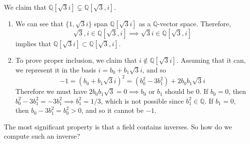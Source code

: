   \begin{example}
    \label{ex:extensions-of-sqrt3i-and-sqrt3i}
    We claim that $\mathbb{Q}[\sqrt{3} i] \subsetneq \mathbb{Q}[\sqrt{3}, i]$. 
    \begin{enumerate}
      \item We can see that $\{1, \sqrt{3}i \}$ span $\mathbb{Q}[\sqrt{3}i ]$ as a $\mathbb{Q}$-vector space. Therefore, 
      \begin{equation}
        \sqrt{3}, i \in \mathbb{Q}[\sqrt{3}, i] \implies \sqrt{3} i \in \mathbb{Q}[\sqrt{3}, i]
      \end{equation} 
      implies that $\mathbb{Q}[\sqrt{3} i] \subset \mathbb{Q}[\sqrt{3}, i]$. 

      \item To prove proper inclusion, we claim that $i \not\in \mathbb{Q}[\sqrt{3}i]$. Assuming that it can, we represent it in the basis $i = b_0 + b_1 \sqrt{3} i$, and so
      \begin{equation}
        -1 = (b_0 + b_1 \sqrt{3} i)^2 = (b_0^2 - 3b_1^2) + 2b_0 b_1 \sqrt{3} i
      \end{equation}
      Therefore we must have $2b_0 b_1 \sqrt{3} = 0 \implies b_0$ or $b_1$ should be $0$. If $b_0 = 0$, then $b_0^2 - 3b_1^2 = -3 b_1^2 \implies b_1^2 = 1/3$, which is not possible since $b_1^2 \in \mathbb{Q}$. If $b_1 = 0$, then $b_0 - 3 b_1^2 = b_0^2 > 0$, and so it cannot be $-1$. 
    \end{enumerate}
  \end{example}

  The most significant property is that a field contains inverses. So how do we compute such an inverse? 

